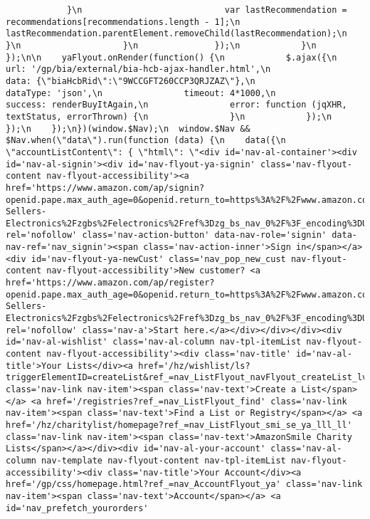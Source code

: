 \documentclass[
]{article}
\begin{document}
\begin{verbatim}
            }\n                            var lastRecommendation = recommendations[recommendations.length - 1];\n                            lastRecommendation.parentElement.removeChild(lastRecommendation);\n                        }\n                    }\n               });\n            }\n        });\n\n    yaFlyout.onRender(function() {\n            $.ajax({\n                url: '/gp/bia/external/bia-hcb-ajax-handler.html',\n                data: {\"biaHcbRid\":\"9WCCGFT260CCP3QRJZAZ\"},\n                dataType: 'json',\n                timeout: 4*1000,\n                success: renderBuyItAgain,\n                error: function (jqXHR, textStatus, errorThrown) {\n                }\n            });\n        });\n    });\n})(window.$Nav);\n  window.$Nav && $Nav.when(\"data\").run(function (data) {\n    data({\n      \"accountListContent\": { \"html\": \"<div id='nav-al-container'><div id='nav-al-signin'><div id='nav-flyout-ya-signin' class='nav-flyout-content nav-flyout-accessibility'><a href='https://www.amazon.com/ap/signin?openid.pape.max_auth_age=0&openid.return_to=https%3A%2F%2Fwww.amazon.com%2FBest-Sellers-Electronics%2Fzgbs%2Felectronics%2Fref%3Dzg_bs_nav_0%2F%3F_encoding%3DUTF8%26ref_%3Dnav_signin&openid.identity=http%3A%2F%2Fspecs.openid.net%2Fauth%2F2.0%2Fidentifier_select&openid.assoc_handle=usflex&openid.mode=checkid_setup&openid.claimed_id=http%3A%2F%2Fspecs.openid.net%2Fauth%2F2.0%2Fidentifier_select&openid.ns=http%3A%2F%2Fspecs.openid.net%2Fauth%2F2.0&' rel='nofollow' class='nav-action-button' data-nav-role='signin' data-nav-ref='nav_signin'><span class='nav-action-inner'>Sign in</span></a><div id='nav-flyout-ya-newCust' class='nav_pop_new_cust nav-flyout-content nav-flyout-accessibility'>New customer? <a href='https://www.amazon.com/ap/register?openid.pape.max_auth_age=0&openid.return_to=https%3A%2F%2Fwww.amazon.com%2FBest-Sellers-Electronics%2Fzgbs%2Felectronics%2Fref%3Dzg_bs_nav_0%2F%3F_encoding%3DUTF8%26ref_%3Dnav_newcust&openid.identity=http%3A%2F%2Fspecs.openid.net%2Fauth%2F2.0%2Fidentifier_select&openid.assoc_handle=usflex&openid.mode=checkid_setup&openid.claimed_id=http%3A%2F%2Fspecs.openid.net%2Fauth%2F2.0%2Fidentifier_select&openid.ns=http%3A%2F%2Fspecs.openid.net%2Fauth%2F2.0&' rel='nofollow' class='nav-a'>Start here.</a></div></div></div><div id='nav-al-wishlist' class='nav-al-column nav-tpl-itemList nav-flyout-content nav-flyout-accessibility'><div class='nav-title' id='nav-al-title'>Your Lists</div><a href='/hz/wishlist/ls?triggerElementID=createList&ref_=nav_ListFlyout_navFlyout_createList_lv_redirect' class='nav-link nav-item'><span class='nav-text'>Create a List</span></a> <a href='/registries?ref_=nav_ListFlyout_find' class='nav-link nav-item'><span class='nav-text'>Find a List or Registry</span></a> <a href='/hz/charitylist/homepage?ref_=nav_ListFlyout_smi_se_ya_lll_ll' class='nav-link nav-item'><span class='nav-text'>AmazonSmile Charity Lists</span></a></div><div id='nav-al-your-account' class='nav-al-column nav-template nav-flyout-content nav-tpl-itemList nav-flyout-accessibility'><div class='nav-title'>Your Account</div><a href='/gp/css/homepage.html?ref_=nav_AccountFlyout_ya' class='nav-link nav-item'><span class='nav-text'>Account</span></a> <a id='nav_prefetch_yourorders' 
\end{verbatim}
\end{document}
